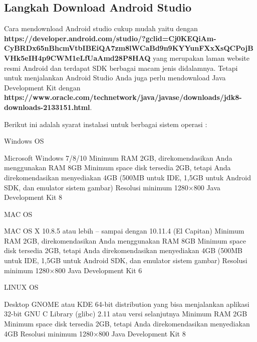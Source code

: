 \begin{enumerate}
\subsection{Langkah Download Android Studio}
Cara mendownload Android studio cukup mudah yaitu dengan \textbf{https://developer.android.com/studio/?gclid=Cj0KEQiAm-CyBRDx65nBhcmVtbIBEiQA7zm8lWCaBd9n9KYYunFXxXsQCPojBVHk5eIH4p9CWM1eLfUaAmd28P8HAQ} yang merupakan laman website resmi Android dan terdapat SDK berbagai macam jenis didalamnya. Tetapi untuk menjalankan Android Studio Anda juga perlu mendownload Java Development Kit dengan \textbf{https://www.oracle.com/technetwork/java/javase/downloads/jdk8-downloads-2133151.html}.

Berikut ini adalah syarat instalasi untuk berbagai sistem operasi :

Windows OS

Microsoft Windows 7/8/10
Minimum RAM 2GB, direkomendasikan Anda menggunakan RAM 8GB
Minimum space disk tersedia 2GB, tetapi Anda direkomendasikan menyediakan 4GB (500MB untuk IDE, 1,5GB untuk Android SDK, dan emulator sistem gambar)
Resolusi minimum 1280×800
Java Development Kit 8
 

MAC OS

MAC OS X 10.8.5 atau lebih – sampai dengan 10.11.4 (El Capitan)
Minimum RAM 2GB, direkomendasikan Anda menggunakan RAM 8GB
Minimum space disk tersedia 2GB, tetapi Anda direkomendasikan menyediakan 4GB (500MB untuk IDE, 1,5GB untuk Android SDK, dan emulator sistem gambar)
Resolusi minimum 1280×800
Java Development Kit 6
 

LINUX OS

Desktop GNOME atau KDE
64-bit distribution yang bisa menjalankan aplikasi 32-bit
GNU C Library (glibc) 2.11 atau versi selanjutnya
Minimum RAM 2GB
Minimum space disk tersedia 2GB, tetapi Anda direkomendasikan menyediakan 4GB
Resolusi minimum 1280×800
Java Development Kit 8
\end{enumerate}

